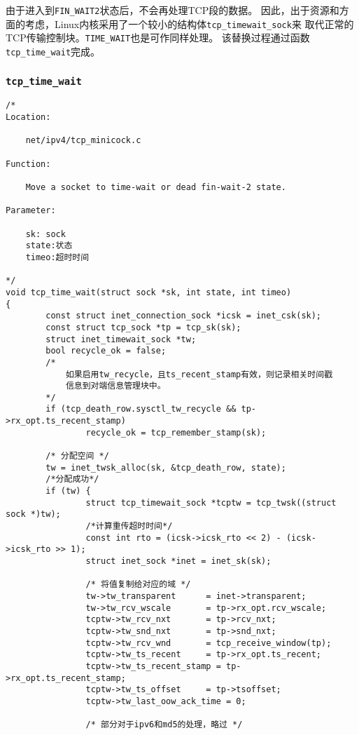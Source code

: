 	由于进入到\texttt{FIN_WAIT2}状态后，不会再处理TCP段的数据。
	因此，出于资源和方面的考虑，Linux内核采用了一个较小的结构体\texttt{tcp_timewait_sock}来
	取代正常的TCP传输控制块。\texttt{TIME_WAIT}也是可作同样处理。
	该替换过程通过函数\texttt{tcp_time_wait}完成。

		\subsubsection{\texttt{tcp_time_wait}}
\begin{verbatim}
/*
Location:

	net/ipv4/tcp_minicock.c

Function:

	Move a socket to time-wait or dead fin-wait-2 state.

Parameter:

	sk: sock
	state:状态
	timeo:超时时间
	
*/
void tcp_time_wait(struct sock *sk, int state, int timeo)
{
        const struct inet_connection_sock *icsk = inet_csk(sk);
        const struct tcp_sock *tp = tcp_sk(sk);
        struct inet_timewait_sock *tw;
        bool recycle_ok = false;
		/*	
			如果启用tw_recycle，且ts_recent_stamp有效，则记录相关时间戳
			信息到对端信息管理块中。
		*/
        if (tcp_death_row.sysctl_tw_recycle && tp->rx_opt.ts_recent_stamp)
                recycle_ok = tcp_remember_stamp(sk);

        /* 分配空间 */
        tw = inet_twsk_alloc(sk, &tcp_death_row, state);
		/*分配成功*/
        if (tw) {
                struct tcp_timewait_sock *tcptw = tcp_twsk((struct sock *)tw);
				/*计算重传超时时间*/
                const int rto = (icsk->icsk_rto << 2) - (icsk->icsk_rto >> 1);
                struct inet_sock *inet = inet_sk(sk);

                /* 将值复制给对应的域 */
                tw->tw_transparent      = inet->transparent;
                tw->tw_rcv_wscale       = tp->rx_opt.rcv_wscale;
                tcptw->tw_rcv_nxt       = tp->rcv_nxt;
                tcptw->tw_snd_nxt       = tp->snd_nxt;
                tcptw->tw_rcv_wnd       = tcp_receive_window(tp);
                tcptw->tw_ts_recent     = tp->rx_opt.ts_recent;
                tcptw->tw_ts_recent_stamp = tp->rx_opt.ts_recent_stamp;
                tcptw->tw_ts_offset     = tp->tsoffset;
                tcptw->tw_last_oow_ack_time = 0;

                /* 部分对于ipv6和md5的处理，略过 */


\end{verbatim}
